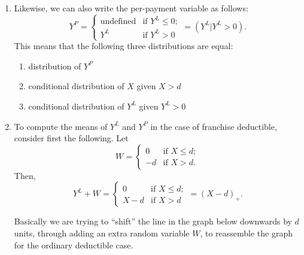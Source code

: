 \begin{enumerate}
These graphs are often useful for obtaining the probabilistic quantities about
per-payment and per-loss variables, as the key  for getting such
quantities is often to relate them with the quantities about \(X\).

\item Likewise, we can also write the per-payment variable as follows:
\[
Y^P=\begin{cases}
\text{undefined}&\text{if \(Y^L\le 0\)};\\
Y^L&\text{if \(Y^L>0\)}
\end{cases}
=\boxed{(Y^L|Y^L>0)}.
\]
This means that the following three distributions are equal:
\begin{enumerate}
\item distribution of \(Y^P\)
\item conditional distribution of \(X\) given \(X>d\)
\item conditional distribution of \(Y^L\) given \(Y^L>0\)
\end{enumerate}

\item \label{it:fran-yl-yp-mean}
To compute the means of \(Y^L\) and \(Y^P\) in the case of franchise
deductible, consider first the following. Let
\[
W=\begin{cases}
0&\text{if \(X\le d\)};\\
-d&\text{if \(X>d\)}.
\end{cases}
\]
Then,
\[
Y^L+W=
\begin{cases}
0&\text{if \(X\le d\)};\\
X-d&\text{if \(X>d\)}
\end{cases}
=(X-d)_{+}.
\]

\begin{intuition}
Basically we are trying to ``shift'' the line in the graph below downwards by
\(d\) units, through adding an extra random variable \(W\), to reassemble the
graph for the ordinary deductible case.
\begin{center}
\end{center}
\end{intuition}



\end{enumerate}
